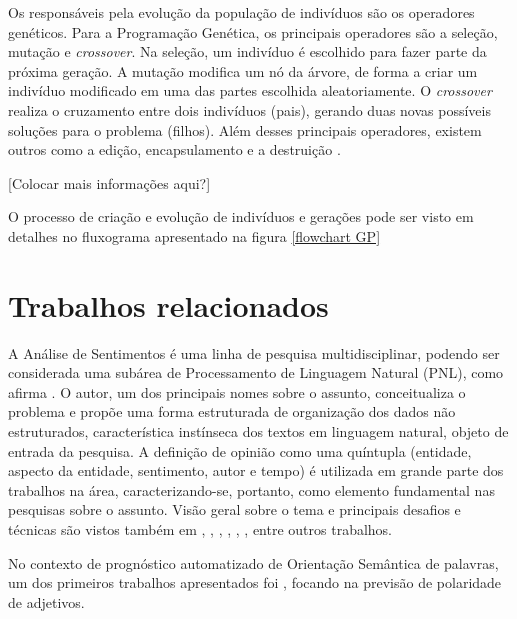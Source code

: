 \documentclass[12pt]{article}
\begin{document}
Os responsáveis pela evolução da população de indivíduos são os operadores genéticos. Para a Programação Genética, os principais operadores são a seleção, mutação e \emph{crossover}. Na seleção, um indivíduo é escolhido para fazer parte da próxima geração. A mutação modifica um nó da árvore, de forma a criar um indivíduo modificado em uma das partes escolhida aleatoriamente. O \emph{crossover} realiza o cruzamento entre dois indivíduos (pais), gerando duas novas possíveis soluções para o problema (filhos). Além desses principais operadores, existem outros como a edição, encapsulamento e a destruição \cite{patelli2011genetic}.

[Colocar mais informações aqui?]

O processo de criação e evolução de indivíduos e gerações pode ser visto em detalhes no fluxograma apresentado na figura \ref{flowchart GP}

\section{Trabalhos relacionados}

\label{sec:bibl}

A Análise de Sentimentos é uma linha de pesquisa multidisciplinar, podendo ser considerada uma subárea de Processamento de Linguagem Natural (PNL), como afirma \cite{liu2010multifaceted}. O autor, um dos principais nomes sobre o assunto, conceitualiza o problema e propõe uma forma estruturada de organização dos dados não estruturados, característica instínseca dos textos em linguagem natural, objeto de entrada da pesquisa. A definição de opinião como uma quíntupla (entidade, aspecto da entidade, sentimento, autor e tempo) é utilizada em grande parte dos trabalhos na área, caracterizando-se, portanto, como elemento fundamental nas pesquisas sobre o assunto. Visão geral sobre o tema e principais desafios e técnicas são vistos também em \cite{mohammad2016challenges}, \cite{ghaleb2016survey}, \cite{kdir16}, \cite{taboada2011lexicon}, \cite{bandhakavi2016lexicon}, \cite{Alessia}, entre outros trabalhos.

No contexto de prognóstico automatizado de Orientação Semântica de palavras, um dos primeiros trabalhos apresentados foi \cite{Hatzivassiloglou}, focando na previsão de polaridade de adjetivos.
\end{document}
